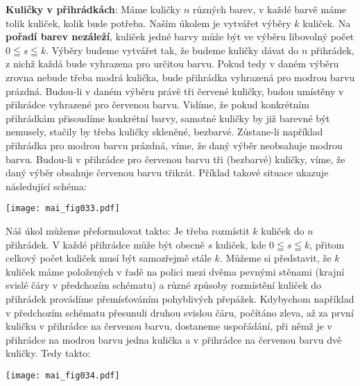 \begin{example}\label{mai:exam009}
  \textbf{Kuličky v přihrádkách}:\newline\small
  Máme kuličky \(n\) různých barev, v každé barvě máme tolik kuliček, kolik bude potřeba. Naším 
  úkolem je vytvářet výběry \(k\) kuliček. Na \textbf{pořadí barev nezáleží}, kuliček jedné barvy 
  může být ve výběru libovolný počet \(0\leqq s \leqq k\). Výběry budeme vytvářet tak, že budeme 
  kuličky dávat do \(n\) přihrádek, z nichž každá bude vyhrazena pro určitou barvu. Pokud tedy v 
  daném výběru zrovna nebude třeba modrá kulička, bude přihrádka vyhrazená pro modrou barvu 
  prázdná. Budou-li v daném výběru právě tři červené kuličky, budou umístěny v přihrádce vyhrazené 
  pro červenou barvu. Vidíme, že pokud konkrétním přihrádkám přisoudíme konkrétní barvy, samotné 
  kuličky by již barevné být nemusely, stačily by třeba kuličky skleněné, bezbarvé. Zůstane-li 
  například přihrádka pro modrou barvu prázdná, víme, že daný výběr neobsahuje modrou barvu. 
  Budou-li v přihrádce pro červenou barvu tři (bezbarvé) kuličky, víme, že daný výběr obsahuje 
  červenou barvu třikrát. Příklad takové situace ukazuje následující schéma:
  
  {\centering
    \texttt{[image: mai\_fig033.pdf]}
    \par}

  Náš úkol můžeme přeformulovat takto: Je třeba rozmístit \(k\) kuliček do \(n\) přihrádek. V každé 
  přihrádce může být obecně \(s\) kuliček, kde \(0\leqq s \leqq k\), přitom celkový počet kuliček 
  musí být samozřejmě stále \(k\). Můžeme si představit, že \(k\) kuliček máme položených v řadě na 
  polici mezi dvěma pevnými stěnami (krajní svislé čáry v předchozím schématu) a různé způsoby 
  rozmístění kuliček do přihrádek provádíme přemísťováním pohyblivých přepážek. Kdybychom například 
  v předchozím schématu přesunuli druhou svislou čáru, počítáno zleva, až za první kuličku v 
  přihrádce na červenou barvu, dostaneme uspořádání, při němž je v přihrádce na modrou barvu jedna 
  kulička a v přihrádce na červenou barvu dvě kuličky. Tedy takto:

  {\centering
    \texttt{[image: mai\_fig034.pdf]}
    \par}


\end{example}
